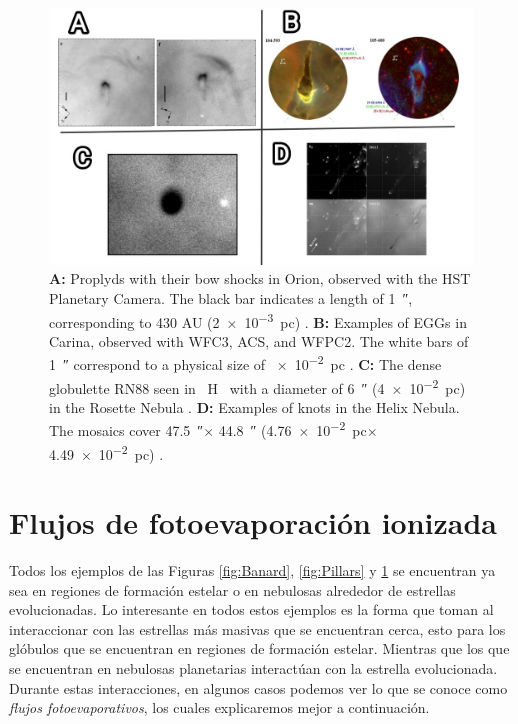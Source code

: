 \documentclass{book}
\begin{document}
\begin{figure}[htb]
    \centering
    \includegraphics[width=1 \textwidth]{images Chapter 1/C1_Globulettes.jpg}
    \caption{\textbf{A:} Proplyds with their bow shocks in Orion,
      observed with the HST Planetary Camera. The black bar indicates
      a length of \SI{1}{\arcsecond}, corresponding to 430 AU
      (\SI{2e-3}{pc}) \citep{Garcia-Arredondo:2001}. \textbf{B:}
      Examples of EGGs in Carina, observed with WFC3, ACS, and WFPC2.
      The white bars of \SI{1}{\arcsecond} correspond to a physical
      size of \SI{e-2}{pc} \citep{Mesa-Delgado:2016}. \textbf{C:} The
      dense globulette RN88 seen in \SI{}{H\alpha} with a diameter of
      \SI{6}{\arcsecond} (\SI{4e-2}{pc}) in the Rosette Nebula
      \citep{GFGahm:2013}. \textbf{D:} Examples of knots in the Helix
      Nebula. The mosaics cover \SI{47.5}{\arcsecond}$\times$
      \SI{44.8}{\arcsecond} (\SI{4.76e-2}{pc}$\times$\SI{4.49e-2}{pc})
      \citep{O'Dell:2007}.}
    \label{fig:nudos}
\end{figure}

\section{Flujos de fotoevaporación ionizada} \label{Sec:fluijos fotoevaporativos}

Todos los ejemplos de las Figuras \ref{fig:Banard}, \ref{fig:Pillars}
y \ref{fig:nudos} se encuentran ya sea en regiones de formación
estelar o en nebulosas alrededor de estrellas evolucionadas. Lo
interesante en todos estos ejemplos es la forma que toman al
interaccionar con las estrellas más masivas que se encuentran cerca,
esto para los glóbulos que se encuentran en regiones de formación
estelar. Mientras que los que se encuentran en nebulosas planetarias
interactúan con la estrella evolucionada. Durante estas interacciones,
en algunos casos podemos ver lo que se conoce como \textit{flujos
  fotoevaporativos}, los cuales explicaremos mejor a continuación.
\end{document}

